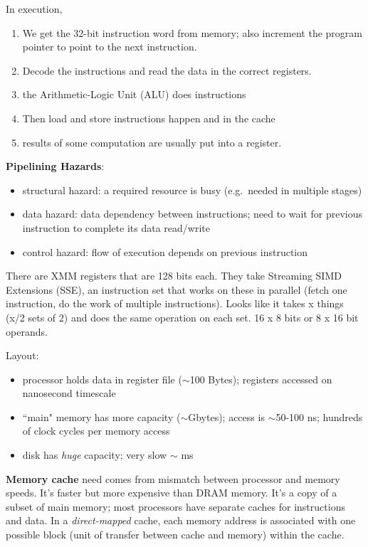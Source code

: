 \documentclass[12pt,twoside]{article}
\begin{document}
In execution, 
\begin{enumerate}
  \item We get the 32-bit instruction word from memory; also increment the program pointer to point to the next instruction. 
  \item Decode the instructions and read the data in the correct registers.  
  \item the Arithmetic-Logic Unit (ALU) does instructions
  \item Then load and store instructions happen and in the cache
  \item results of some computation are usually put into a register.
\end{enumerate}

\textbf{Pipelining Hazards}:
\begin{itemize}
  \item structural hazard: a required resource is busy (e.g.\ needed in multiple stages) 
  \item data hazard: data dependency between instructions; need to wait for previous instruction to complete its data read/write
  \item control hazard: flow of execution depends on previous instruction
\end{itemize}

There are XMM registers that are 128 bits each. They take Streaming SIMD Extensions (SSE), an instruction set that works on these in parallel (fetch one instruction, do the work of multiple instructions). Looks like it takes x things (x/2 sets of 2) and does the same operation on each set. 16 x 8 bits or 8 x 16 bit operands.

Layout: 
\begin{itemize}
  \item processor holds data in register file ($\sim$100 Bytes); registers accessed on nanosecond timescale
  \item ``main" memory has more capacity ($\sim$Gbytes); access is $\sim$50-100 ns; hundreds of clock cycles per memory access
  \item disk has \textit{huge} capacity; very slow $\sim$ ms
\end{itemize}	

\textbf{Memory cache} need comes from mismatch between processor and memory speeds. 
It's faster but more expensive than DRAM memory.
It's a copy of a subset of main memory; most processors have separate caches for instructions and data.
In a \textit{direct-mapped} cache, each memory address is associated with one possible block (unit of transfer between cache and memory) within the cache.
\end{document}

